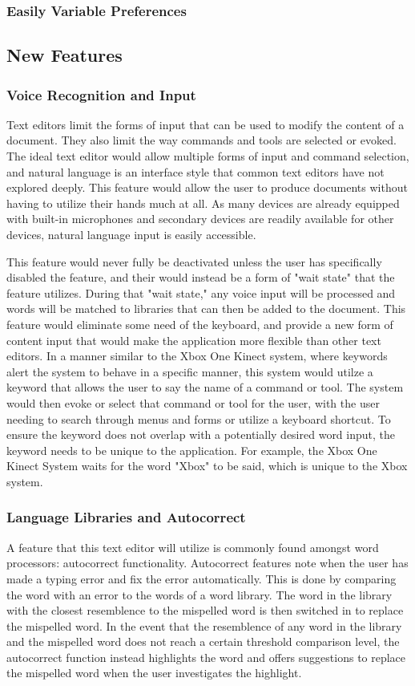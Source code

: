 \documentclass[11pt, oneside]{article}
\begin{document}
\subsubsection{Easily Variable Preferences}

\subsection{New Features}
\subsubsection{Voice Recognition and Input}
Text editors limit the forms of input that can be used to modify the content of a document. They also limit the way commands and tools are selected or evoked. The ideal text editor would allow multiple forms of input and command selection, and natural language is an interface style that common text editors have not explored deeply. This feature would allow the user to produce documents without having to utilize their hands much at all. As many devices are already equipped with built-in microphones and secondary devices are readily available for other devices, natural language input is easily accessible. 

This feature would never fully be deactivated unless the user has specifically disabled the feature, and their would instead be a form of "wait state" that the feature utilizes. During that "wait state," any voice input will be processed and words will be matched to libraries that can then be added to the document. This feature would eliminate some need of the keyboard, and provide a new form of content input that would make the application more flexible than other text editors. In a manner similar to the Xbox One Kinect system, where keywords alert the system to behave in a specific manner, this system would utilze a keyword that allows the user to say the name of a command or tool. The system would then evoke or select that command or tool for the user, with the user needing to search through menus and forms or utilize a keyboard shortcut. To ensure the keyword does not overlap with a potentially desired word input, the keyword needs to be unique to the application. For example, the Xbox One Kinect System waits for the word "Xbox" to be said, which is unique to the Xbox system. 

\subsubsection{Language Libraries and Autocorrect}
A feature that this text editor will utilize is commonly found amongst word processors: autocorrect functionality. Autocorrect features note when the user has made a typing error and fix the error automatically. This is done by comparing the word with an error to the words of a word library. The word in the library with the closest resemblence to the mispelled word is then switched in to replace the mispelled word. In the event that the resemblence of any word in the library and the mispelled word does not reach a certain threshold comparison level, the autocorrect function instead highlights the word and offers suggestions to replace the mispelled word when the user investigates the highlight. 
\end{document}
